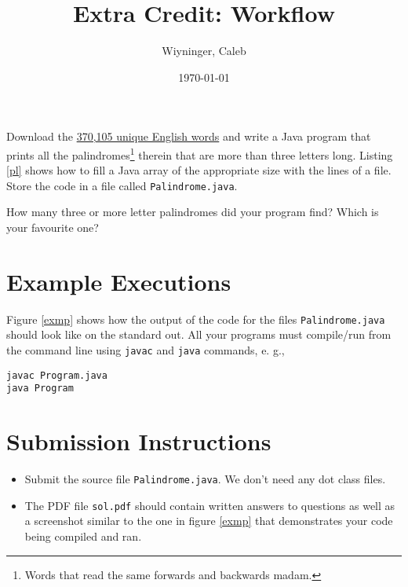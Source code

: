 \documentclass{homework}
\author{Wiyninger, Caleb}
\date{\today}
\title{Extra Credit: Workflow}
\newcommand\callit[1]{Store the code in a file called \texttt{#1}.}
\newcommand\englishwords{%
  \href{%
    https://raw.githubusercontent.com/dwyl/english-words/master/words_alpha.txt%
  }{370,105 unique English words}%
}
\begin{document}
 \maketitle

\question Download the \englishwords{} and write a Java program that prints
all the palindromes\footnote{Words that read the same forwards and
  backwards \eg madam.} therein that are more than three letters
long. Listing \ref{pl} shows how to fill a Java array of the
appropriate size with the lines of a file.
\callit{Palindrome.java}

% 

\question How many three or more letter palindromes did your program find?
Which is your favourite one?

\section{Example Executions}

Figure \ref{exmp} shows how the output of the code for the files
\texttt{Palindrome.java} should look like on the standard out. All
your programs must compile/run from the command line using
\texttt{javac} and \texttt{java} commands, e. g.,

\begin{verbatim}
javac Program.java
java Program
\end{verbatim}


\section{Submission Instructions}

\begin{itemize}
  \item Submit the source file \texttt{Palindrome.java}. We don't need any
        dot class files.
  \item The PDF file \texttt{sol.pdf} should contain written answers to
        questions as well as a screenshot similar to the one in figure \ref{exmp}
        that demonstrates your code being compiled and ran.
\end{itemize}
\end{document}
